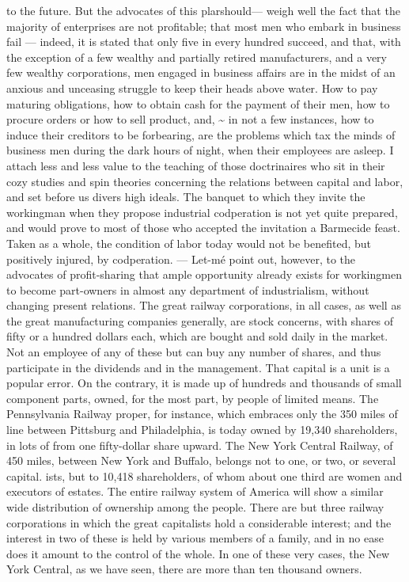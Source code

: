 \documentclass[11pt,openany]{book}
\begin{document}
to the future. But the advocates of this plarshould--- weigh well the fact that the majority of enterprises are not profitable; that most men who embark in business fail --- indeed, it is stated that only five in every hundred succeed, and that, with the exception of a few wealthy and partially retired manufacturers, and a very few wealthy corporations, men engaged in business affairs are in the midst of an anxious and unceasing struggle to keep their heads above water. How to pay maturing obligations, how to obtain cash for the payment of their men, how to procure orders or how to sell product, and, \textasciitilde{} in not a few instances, how to induce their creditors to be forbearing, are the problems which tax the minds of business men during the dark hours of night, when their employees are asleep. I attach less and less value to the teaching of those doctrinaires who sit in their cozy studies and spin theories concerning the relations between capital and labor, and set before us divers high ideals. The banquet to which they invite the workingman when they propose industrial codperation is not yet quite prepared, and would prove to most of those who accepted the invitation a Barmecide feast. Taken as a whole, the condition of labor today would not be benefited, but positively injured, by codperation. --- Let-mé point out, however, to the advocates of profit-sharing that ample opportunity already exists for workingmen to become part-owners in almost any department of industrialism, without changing present relations. The great railway corporations, in all cases, as well as the great manufacturing companies generally, are stock concerns, with shares of fifty or a hundred dollars each, which are bought and sold daily in the market. Not an employee of any of these but can buy any number of shares, and thus participate in the dividends and in the management. That capital is a unit is a popular error. On the contrary, it is made up of hundreds and thousands of small component parts, owned, for the most part, by people of limited means. The Pennsylvania Railway proper, for instance, which embraces only the 350 miles of line between Pittsburg and Philadelphia, is today owned by 19,340 shareholders, in lots of from one fifty-dollar share upward. The New York Central Railway, of 450 miles, between New York and Buffalo, belongs not to one, or two, or several capital. ists, but to 10,418 shareholders, of whom about one third are women and executors of estates. The entire railway system of America will show a similar wide distribution of ownership among the people. There are but three railway corporations in which the great capitalists hold a considerable interest; and the interest in two of these is held by various members of a family, and in no ease does it amount to the control of the whole. In one of these very cases, the New York Central, as we have seen, there are more than ten thousand owners.
\end{document}
